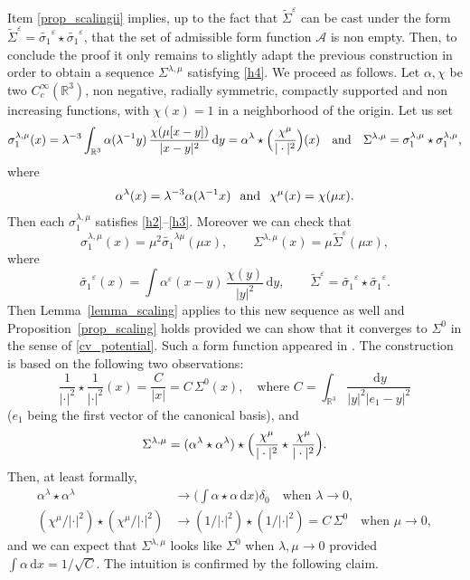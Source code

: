 \documentclass[JEP,XML,SOM,NoEqCountersInSection,NoFloatCountersInSection,Unicode,published]{cedram}
\let\epsilon\varepsilon
\theoremstyle{definition}
\newcommand{\R}{\mathbb{R}}
\let\ds\displaystyle
\newcommand{\ud}{\, {\mathrm{d}}}
\begin{document}
Item \eqref{prop_scalingii} implies, up to the fact that $\widetilde{\Sigma}^{\epsilon}$ can be cast under the form $\widetilde{\Sigma}^{\epsilon}=\widetilde{\sigma_{1}}^{\epsilon}\star\widetilde{\sigma_{1}}^{\epsilon}$, that the set of admissible form function $\mathscr{A}$ is non empty. Then, to conclude the proof it only remains to slightly adapt the previous construction in order to obtain a sequence $\Sigma^{\lambda,\mu}$ satisfying \eqref{h4}.
We proceed as follows.
Let $\alpha, \chi$ be two $C^\infty_c(\mathbb R^3)$, non negative, radially symmetric, compactly supported and non increasing functions, with $\chi(x)=1$ in a neighborhood of the origin.
Let us set
\[
\sigma_{1}^{\lambda,\mu}(x)=\lambda^{-3}\int_{\R^{3}}\alpha(\lambda^{-1}y)\,\frac{\chi(\mu[x-y])}{|x-y|^{2}}\ud y=\alpha^{\lambda}\star\Bigl(\frac{\chi^{\mu}}{|\cdot|^{2}}\Bigr)(x)
\quad\text{and}\quad
\Sigma^{\lambda,\mu}=\sigma_{1}^{\lambda,\mu}\star\sigma_{1}^{\lambda,\mu},
\]
where
\[
\alpha^{\lambda}(x)=\lambda^{-3}\alpha(\lambda^{-1}x) \hspace{0.25cm}\text{and}\hspace{0.25cm} \chi^{\mu}(x)=\chi(\mu x).
\]
Then each $\sigma_{1}^{\lambda,\mu}$ satisfies \eqref{h2}--\eqref{h3}. Moreover we can check that
\[
\sigma_{1}^{\lambda,\mu}(x)=\mu^{2}\widetilde{\sigma_{1}}^{\lambda\mu}(\mu x),\qquad
\Sigma^{\lambda,\mu}(x)=\mu\widetilde{\Sigma}^{\epsilon}(\mu x),
\]
where
\[
\widetilde{\sigma_{1}}^{\epsilon}(x)=\ds\int \alpha^{\epsilon}(x-y)\,\frac{\chi (y)}{| y |^{2}}\ud y,
\qquad
\widetilde{\Sigma}^{\epsilon}=\widetilde{\sigma_{1}}^{\epsilon}\star\widetilde{\sigma_{1}}^{\epsilon}.
\]
Then Lemma~\ref{lemma_scaling} applies to this new sequence as well and Proposition~\ref{prop_scaling} holds
provided we can show that it
converges to $\Sigma^{0}$ in the sense of \eqref{cv_potential}.
Such a form function appeared in \cite{dBGV}. The construction is based on the following two observations:
\[
\frac{1}{|\cdot|^{2}}\star\frac{1}{|\cdot|^{2}}(x)=\frac{C}{|x|}=C\,\Sigma^{0}(x),\quad\text{where } C=\int_{\R^{3}}\frac{\ud y}{|y|^2|e_1-y|^2}
\]
($e_1$ being the first vector of the canonical basis),
and
\[
\Sigma^{\lambda,\mu}=(\alpha^{\lambda}\star\alpha^{\lambda})\star\Bigl(\frac{\chi^{\mu}}{|\cdot|^{2}}\star\frac{\chi^{\mu}}{|\cdot|^{2}}\Bigr).
\]
Then, at least formally,
\begin{align*}
\alpha^{\lambda}\star\alpha^{\lambda}&\to\biggl(\int\alpha\star\alpha\ud x\biggr)\delta_{0}\quad\text{when }\lambda\to 0,\\
(\chi^{\mu}/|\cdot|^{2})\star(\chi^{\mu}/|\cdot|^{2})&\to(1/|\cdot|^{2})\star(1/|\cdot|^{2})=C\,\Sigma^{0}\quad\text{when }\mu\to 0,
\end{align*}
and we can expect that $\Sigma^{\lambda,\mu}$ looks like
$\Sigma^{0}$ when $\lambda,\mu\to 0$ provided $\int\alpha\ud x=1/\sqrt{C}$.
The intuition is confirmed by the following claim.
\end{document}
